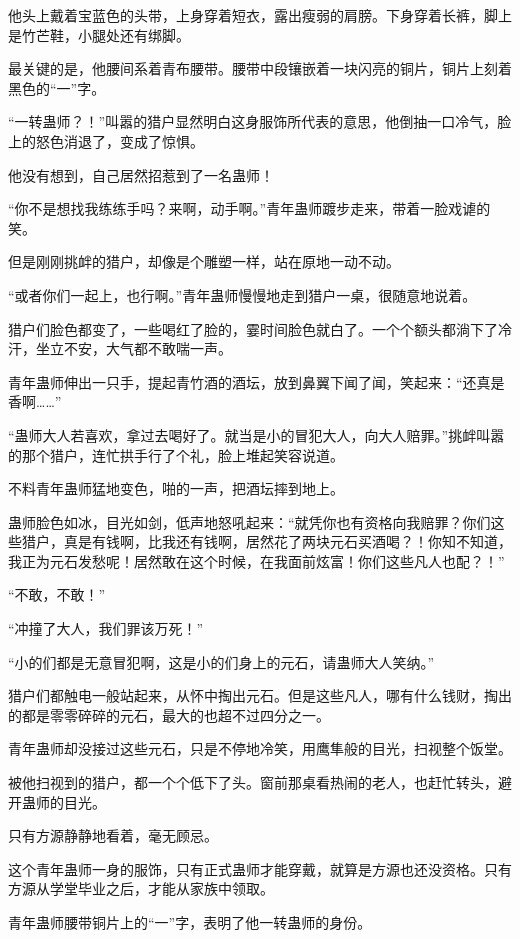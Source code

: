 \begin{this_body}
他头上戴着宝蓝色的头带，上身穿着短衣，露出瘦弱的肩膀。下身穿着长裤，脚上是竹芒鞋，小腿处还有绑脚。

最关键的是，他腰间系着青布腰带。腰带中段镶嵌着一块闪亮的铜片，铜片上刻着黑色的“一”字。

“一转蛊师？！”叫嚣的猎户显然明白这身服饰所代表的意思，他倒抽一口冷气，脸上的怒色消退了，变成了惊惧。

他没有想到，自己居然招惹到了一名蛊师！

“你不是想找我练练手吗？来啊，动手啊。”青年蛊师踱步走来，带着一脸戏谑的笑。

但是刚刚挑衅的猎户，却像是个雕塑一样，站在原地一动不动。

“或者你们一起上，也行啊。”青年蛊师慢慢地走到猎户一桌，很随意地说着。

猎户们脸色都变了，一些喝红了脸的，霎时间脸色就白了。一个个额头都淌下了冷汗，坐立不安，大气都不敢喘一声。

青年蛊师伸出一只手，提起青竹酒的酒坛，放到鼻翼下闻了闻，笑起来：“还真是香啊……”

“蛊师大人若喜欢，拿过去喝好了。就当是小的冒犯大人，向大人赔罪。”挑衅叫嚣的那个猎户，连忙拱手行了个礼，脸上堆起笑容说道。

不料青年蛊师猛地变色，啪的一声，把酒坛摔到地上。

蛊师脸色如冰，目光如剑，低声地怒吼起来：“就凭你也有资格向我赔罪？你们这些猎户，真是有钱啊，比我还有钱啊，居然花了两块元石买酒喝？！你知不知道，我正为元石发愁呢！居然敢在这个时候，在我面前炫富！你们这些凡人也配？！”

“不敢，不敢！”

“冲撞了大人，我们罪该万死！”

“小的们都是无意冒犯啊，这是小的们身上的元石，请蛊师大人笑纳。”

猎户们都触电一般站起来，从怀中掏出元石。但是这些凡人，哪有什么钱财，掏出的都是零零碎碎的元石，最大的也超不过四分之一。

青年蛊师却没接过这些元石，只是不停地冷笑，用鹰隼般的目光，扫视整个饭堂。

被他扫视到的猎户，都一个个低下了头。窗前那桌看热闹的老人，也赶忙转头，避开蛊师的目光。

只有方源静静地看着，毫无顾忌。

这个青年蛊师一身的服饰，只有正式蛊师才能穿戴，就算是方源也还没资格。只有方源从学堂毕业之后，才能从家族中领取。

青年蛊师腰带铜片上的“一”字，表明了他一转蛊师的身份。


\end{this_body}
